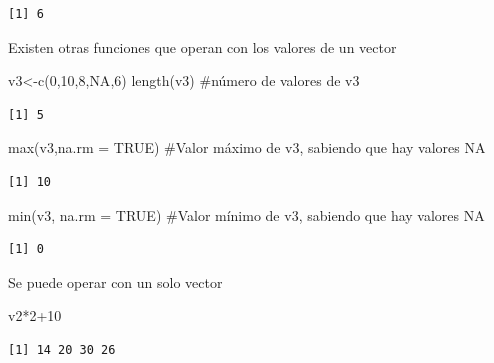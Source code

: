 \documentclass[
  letterpaper,
]{scrbook}
\newenvironment{Shaded}{\begin{snugshade}}{\end{snugshade}}
\newcommand{\AttributeTok}[1]{\textcolor[rgb]{0.40,0.45,0.13}{#1}}
\newcommand{\CommentTok}[1]{\textcolor[rgb]{0.37,0.37,0.37}{#1}}
\newcommand{\ConstantTok}[1]{\textcolor[rgb]{0.56,0.35,0.01}{#1}}
\newcommand{\DecValTok}[1]{\textcolor[rgb]{0.68,0.00,0.00}{#1}}
\newcommand{\FunctionTok}[1]{\textcolor[rgb]{0.28,0.35,0.67}{#1}}
\newcommand{\NormalTok}[1]{\textcolor[rgb]{0.00,0.23,0.31}{#1}}
\newcommand{\OtherTok}[1]{\textcolor[rgb]{0.00,0.23,0.31}{#1}}
\newcommand{\SpecialCharTok}[1]{\textcolor[rgb]{0.37,0.37,0.37}{#1}}
\begin{document}
\begin{verbatim}
[1] 6
\end{verbatim}

Existen otras funciones que operan con los valores de un vector

\begin{Shaded}
\begin{Highlighting}[]
\NormalTok{v3}\OtherTok{\textless{}{-}}\FunctionTok{c}\NormalTok{(}\DecValTok{0}\NormalTok{,}\DecValTok{10}\NormalTok{,}\DecValTok{8}\NormalTok{,}\ConstantTok{NA}\NormalTok{,}\DecValTok{6}\NormalTok{)}
\FunctionTok{length}\NormalTok{(v3) }\CommentTok{\#número de valores de v3}
\end{Highlighting}
\end{Shaded}

\begin{verbatim}
[1] 5
\end{verbatim}

\begin{Shaded}
\begin{Highlighting}[]
\FunctionTok{max}\NormalTok{(v3,}\AttributeTok{na.rm =} \ConstantTok{TRUE}\NormalTok{) }\CommentTok{\#Valor máximo de v3, sabiendo que hay valores NA}
\end{Highlighting}
\end{Shaded}

\begin{verbatim}
[1] 10
\end{verbatim}

\begin{Shaded}
\begin{Highlighting}[]
\FunctionTok{min}\NormalTok{(v3, }\AttributeTok{na.rm =} \ConstantTok{TRUE}\NormalTok{) }\CommentTok{\#Valor mínimo de v3, sabiendo que hay valores NA}
\end{Highlighting}
\end{Shaded}

\begin{verbatim}
[1] 0
\end{verbatim}

Se puede operar con un solo vector

\begin{Shaded}
\begin{Highlighting}[]
\NormalTok{v2}\SpecialCharTok{*}\DecValTok{2}\SpecialCharTok{+}\DecValTok{10}
\end{Highlighting}
\end{Shaded}

\begin{verbatim}
[1] 14 20 30 26
\end{verbatim}
\end{document}
